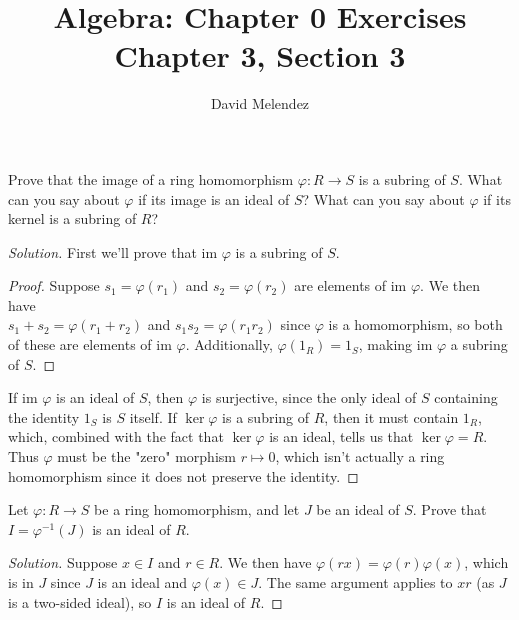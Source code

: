\documentclass[12pt]{article}
\newenvironment{problem}[2][Problem]{\begin{trivlist}
\item[\hskip \labelsep {\bfseries #1}\hskip \labelsep {\bfseries #2.}]}{\end{trivlist}}
\newcommand{\im}{\text{im }}
\newenvironment{solution}
  {\renewcommand\qedsymbol{$\blacksquare$}\begin{proof}[Solution]}
{\end{proof}}
\newenvironment{sproof}{
  \renewcommand\qedsymbol{$\square$}
  \begin{proof}
  }{
  \end{proof}
}
\theoremstyle{remark}
\begin{document}
\title{Algebra: Chapter 0 Exercises\\ \large Chapter 3, Section 3}
\author{David Melendez}
\maketitle

\begin{problem}{3.1}
  Prove that the image of a ring homomorphism $\varphi:R\to S$ is a subring of $S$.
  What can you say about $\varphi$ if its image is an ideal of $S$?
  What can you say about $\varphi$ if its kernel is a subring of $R$?
\end{problem}
\begin{solution}
  First we'll prove that $\im \varphi$ is a subring of $S$.
  \begin{sproof}
    Suppose $s_1=\varphi(r_1)$ and $s_2=\varphi(r_2)$ are elements of $\im\varphi$.
    We then have \\ $s_1+s_2=\varphi(r_1+r_2)$ and $s_1s_2=\varphi(r_1r_2)$ since $\varphi$
    is a homomorphism, so both of these are elements of $\im\varphi$.
    Additionally, $\varphi(1_R)=1_S$, making $\im\varphi$ a subring of $S$.
  \end{sproof}
  If $\im\varphi$ is an ideal of $S$, then $\varphi$ is surjective, since the only ideal of $S$
  containing the identity $1_S$ is $S$ itself.
  If $\ker\varphi$ is a subring of $R$, then it must contain $1_R$, which, combined with
  the fact that $\ker\varphi$ is an ideal, tells us that $\ker\varphi=R$. Thus $\varphi$
  must be the "zero" morphism $r\mapsto 0$, which isn't actually a ring homomorphism since it
  does not preserve the identity.
\end{solution}

\begin{problem}{3.2}
  Let $\varphi:R\to S$ be a ring homomorphism, and let $J$ be an ideal of $S$.
  Prove that $I=\varphi^{-1}(J)$ is an ideal of $R$.
\end{problem}
\begin{solution}
  Suppose $x\in I$ and $r\in R$.
  We then have $\varphi(rx) = \varphi(r)\varphi(x)$, which is in $J$ since $J$ is an ideal and
  $\varphi(x)\in J$.
  The same argument applies to $xr$ (as $J$ is a two-sided ideal), so $I$ is an ideal of $R$.
\end{solution}
\end{document}
